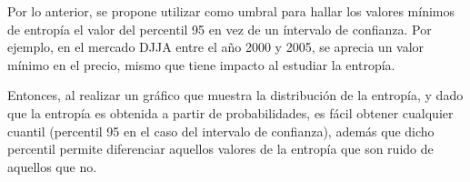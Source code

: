 Por lo anterior, se propone utilizar como umbral para hallar los valores mínimos de entropía el valor del percentil 95 en vez de un íntervalo de confianza. Por ejemplo, en el mercado DJJA entre el año 2000 y 2005, se aprecia un valor mínimo en el precio, mismo que tiene impacto al estudiar la entropía.


Entonces, al realizar un gráfico que muestra la distribución de la entropía, y dado que la entropía es obtenida a partir de probabilidades, es fácil obtener cualquier cuantil (percentil 95 en el caso del intervalo de confianza), además que dicho percentil permite diferenciar aquellos valores de la entropía que son ruido de aquellos que no. 


\section{}

